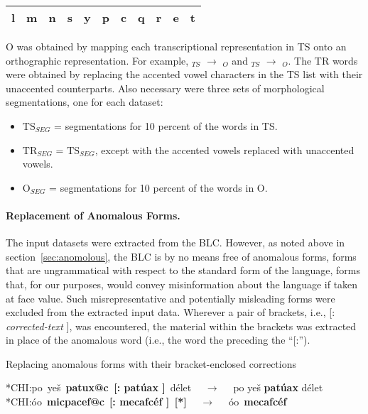 \begin{table}[ht]
\begin{tabular}{c c c c c c c c c c c}
          l & m &
	n & s & y & p & c & q & r & e & t \\
\bottomrule
\end{tabular}
\end{table}
O was obtained by mapping each transcriptional representation 
in TS onto an orthographic representation. For example, $_{TS}$ $\to$
$_{O}$ and $_{TS}$ $\to$ $_{O}$. 
The TR words were obtained by 
replacing the accented vowel characters in the TS list with their unaccented counterparts.
Also necessary were three sets of morphological segmentations, one for each dataset: %
\begin{itemize}
\item $\text{TS}_{SEG}$ = segmentations for 10 percent of the words in TS.
\item $\text{TR}_{SEG}$ = $\text{TS}_{SEG}$, except with the accented vowels replaced
with unaccented vowels.
\item  $\text{O}_{SEG}$ = segmentations for 10 percent of the words in O.
\end{itemize} 

\paragraph{Replacement of Anomalous Forms.} 
The input datasets were extracted from the \ac{BLC}. However, as noted above in 
section~\ref{sec:anomolous}, the \ac{BLC} is by no means free of anomalous forms, 
forms that are ungrammatical with respect to the standard form of the language, 
forms that, for our purposes, would convey misinformation about the language if taken at face value. 
Such misrepresentative and potentially misleading forms were excluded from the 
extracted input data.  
Wherever a pair of brackets, i.e., \textsf{[: \textit{corrected-text} ]}, was encountered, 
the material within the brackets was extracted in place of the anomalous word (i.e., the 
word the preceding the ``\textsf{[:}'').

\begin{exe}
	\ex Replacing anomalous forms with their bracket-enclosed corrections
	\begin{xlist} \label{ex:replace}
	   \ex \textsf{*CHI:}\quad\textsf{po\, ye\v{s}\, \textbf{patux@c\, [: pat\'{u}ax ]}\, d\'{e}let} $\quad\to\quad$
	   \textsf{po ye\v{s} \textbf{pat\'{u}ax} d\'{e}let} 
	   \ex \textsf{*CHI:}\quad\textsf{\textglotstop\'{o}o\, \textbf{micpacef@c}\, \textbf{[: mecafc\'ef ]\, [*]}} $\quad\to\quad$ \textsf{\textglotstop\'oo\, \textbf{mecafc\'ef}}
	\end{xlist}
\end{exe} 

